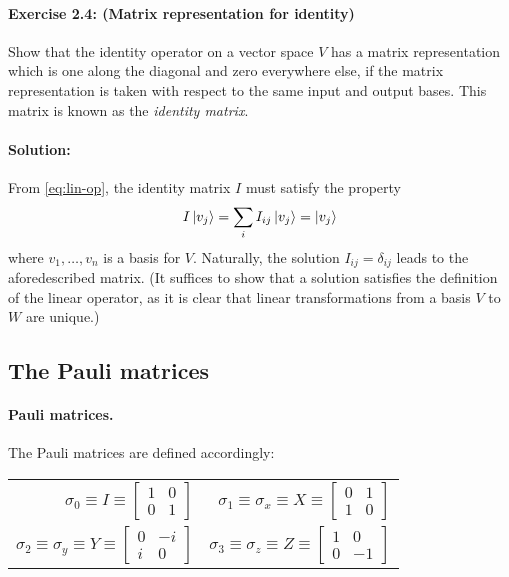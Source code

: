 \documentclass{article}
\begin{document}
\paragraph{\cite{mikeandike} Exercise 2.4: (Matrix representation for
identity)} Show that the identity operator on a vector space $V$ has a matrix
representation which is one along the diagonal and zero everywhere else, if the
matrix representation is taken with respect to the same input and output bases.
This matrix is known as the \emph{identity matrix}.

\paragraph{Solution:} From \eqref{eq:lin-op}, the identity matrix $I$ must
satisfy the property \begin{equation*}
  I\ket{v_j} = \sum_i I_{ij}\ket{v_j} = \ket{v_j}
\end{equation*} where $v_1, \ldots, v_n$ is a basis for $V$. Naturally, the
solution $I_{ij} = \delta_{ij}$ leads to the aforedescribed matrix. (It
suffices to show that a solution satisfies the definition of the linear
operator, as it is clear that linear transformations from a basis $V$ to $W$
are unique.)

\subsection{The Pauli matrices}

\paragraph{Pauli matrices.} The Pauli matrices are defined accordingly:

\begin{center}
  \begin{tabular}{r r}
    \addlinespace[1em]
    $\sigma_0 \equiv I \equiv \begin{bmatrix}
      1 & 0 \\
      0 & 1
    \end{bmatrix}$ & $\sigma_1 \equiv \sigma_x \equiv X \equiv \begin{bmatrix}
      0 & 1 \\
      1 & 0
    \end{bmatrix}$ \\
    \addlinespace[1em]
    $\sigma_2 \equiv \sigma_y \equiv Y \equiv \begin{bmatrix}
      0 & -i \\
      i & 0
    \end{bmatrix}$ & $\sigma_3 \equiv \sigma_z \equiv Z \equiv \begin{bmatrix}
      1 & 0 \\
      0 & -1
    \end{bmatrix}$
  \end{tabular}
\end{center}
\end{document}
